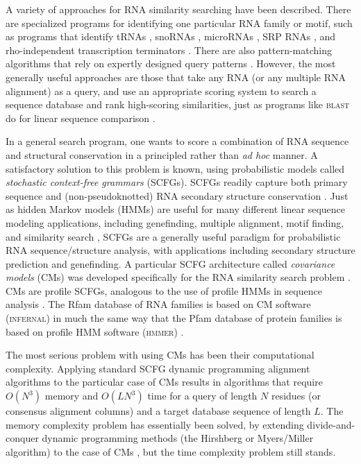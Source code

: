 \documentclass[11pt]{article}
\begin{document}
A variety of approaches for RNA similarity searching have been
described. There are specialized programs for identifying one
particular RNA family or motif, such as programs that identify tRNAs
\cite{LoweEddy97,Laslett04}, snoRNAs \cite{LoweEddy99,Schattner06},
microRNAs \cite{Lai03, Lim03}, SRP RNAs \cite{Regalia02}, and
rho-independent transcription terminators \cite{Ermolaeva00}. There
are also pattern-matching algorithms that
rely on expertly designed query patterns \cite{Macke01,Gautheret01}. However, the most generally
useful approaches are those that take any RNA (or any multiple RNA
alignment) as a query, and use an appropriate
scoring system to search a sequence database and rank high-scoring
similarities, just as programs like \textsc{blast} do for linear sequence
comparison \cite{Altschul97}.

In a general search program, one wants to score a
combination of RNA sequence and structural conservation in a
principled rather than \emph{ad hoc} manner. A satisfactory solution
to this problem is known, using probabilistic models called
\emph{stochastic context-free grammars} (SCFGs). SCFGs readily capture
both primary sequence and (non-pseudoknotted) RNA secondary structure
conservation \cite{Sakakibara94c,Durbin98}. Just as hidden Markov
models (HMMs) are useful for many different linear sequence modeling
applications, including genefinding, multiple alignment, motif
finding, and similarity search \cite{Durbin98}, SCFGs are a generally
useful paradigm for probabilistic RNA sequence/structure analysis,
with applications including secondary structure prediction and
genefinding. A particular SCFG architecture called \emph{covariance
models} (CMs) was developed specifically for the RNA similarity search
problem \cite{Eddy94}.  CMs are profile SCFGs, analogous to the use of
profile HMMs in sequence analysis \cite{Eddy94,Eddy02b}.  The Rfam
database of RNA families \cite{Griffiths-Jones05} is based on CM
software (\textsc{infernal}) in much the same way that the Pfam
database of protein families is based on profile HMM software
(\textsc{hmmer}) \cite{Sonnhammer98,Finn06}.

The most serious problem with using CMs has been their computational
complexity. Applying standard SCFG dynamic programming alignment
algorithms to the particular case of CMs results in algorithms that
require $O(N^3)$ memory and $O(L N^3)$ time for a query of length $N$
residues (or consensus alignment columns) and a target database
sequence of length $L$.  The memory complexity problem has essentially
been solved, by extending divide-and-conquer dynamic programming
methods (the Hirshberg or Myers/Miller algorithm) to the case of CMs
\cite{Eddy02b}, but the time complexity problem still stands.
\end{document}
